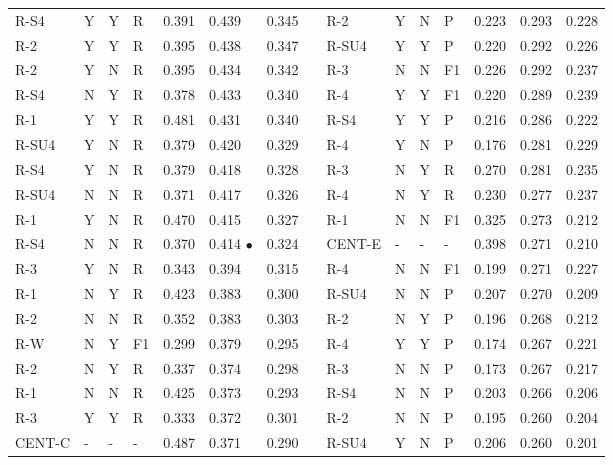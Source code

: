 \documentclass[11pt,a4paper]{article}
\begin{document}
\begin{table}[]
{\begin{tabular}{lllllllllllllll}
\textsc{R-S4} & Y & Y & R & 0.391 & 0.439 & 0.345 &  & \textsc{R-2} & Y & N & P & 0.223 & 0.293 & 0.228 \\
\textsc{R-2} & Y & Y & R & 0.395 & 0.438 & 0.347 &  & \textsc{R-SU4} & Y & Y & P & 0.220 & 0.292 & 0.226 \\
\textsc{R-2} & Y & N & R & 0.395 & 0.434 & 0.342 &  & \textsc{R-3} & N & N & F1 & 0.226 & 0.292 & 0.237 \\
\textsc{R-S4} & N & Y & R & 0.378 & 0.433 & 0.340 &  & \textsc{R-4} & Y & Y & F1 & 0.220 & 0.289 & 0.239 \\
\textsc{R-1} & Y & Y & R & 0.481 & 0.431 & 0.340 &  & \textsc{R-S4} & Y & Y & P & 0.216 & 0.286 & 0.222 \\
\textsc{R-SU4} & Y & N & R & 0.379 & 0.420 & 0.329 &  & \textsc{R-4} & Y & N & P & 0.176 & 0.281 & 0.229 \\
\textsc{R-S4} & Y & N & R & 0.379 & 0.418 & 0.328 &  & \textsc{R-3} & N & Y & R & 0.270 & 0.281 & 0.235 \\
\textsc{R-SU4} & N & N & R & 0.371 & 0.417 & 0.326 &  & \textsc{R-4} & N & Y & R & 0.230 & 0.277 & 0.237 \\
\textsc{R-1} & Y & N & R & 0.470 & 0.415 & 0.327 &  & \textsc{R-1} & N & N & F1 & 0.325 & 0.273 & 0.212 \\
\textsc{R-S4} & N & N & R & 0.370 & 0.414 $\bullet$ & 0.324 &  & \textsc{CENT-E} & - & - & - & 0.398 & 0.271 & 0.210 \\
\textsc{R-3} & Y & N & R & 0.343 & 0.394 & 0.315 &  & \textsc{R-4} & N & N & F1 & 0.199 & 0.271 & 0.227 \\
\textsc{R-1} & N & Y & R & 0.423 & 0.383 & 0.300 &  & \textsc{R-SU4} & N & N & P & 0.207 & 0.270 & 0.209 \\
\textsc{R-2} & N & N & R & 0.352 & 0.383 & 0.303 &  & \textsc{R-2} & N & Y & P & 0.196 & 0.268 & 0.212 \\
\textsc{R-W} & N & Y & F1 & 0.299 & 0.379 & 0.295 &  & \textsc{R-4} & Y & Y & P & 0.174 & 0.267 & 0.221 \\
\textsc{R-2} & N & Y & R & 0.337 & 0.374 & 0.298 &  & \textsc{R-3} & N & N & P & 0.173 & 0.267 & 0.217 \\
\textsc{R-1} & N & N & R & 0.425 & 0.373 & 0.293 &  & \textsc{R-S4} & N & N & P & 0.203 & 0.266 & 0.206 \\
\textsc{R-3} & Y & Y & R & 0.333 & 0.372 & 0.301 &  & \textsc{R-2} & N & N & P & 0.195 & 0.260 & 0.204 \\
\textsc{CENT-C} & - & - & - & 0.487 & 0.371 & 0.290 &  & \textsc{R-SU4} & Y & N & P & 0.206 & 0.260 & 0.201 \\

\end{tabular}}
\end{table}
\end{document}
